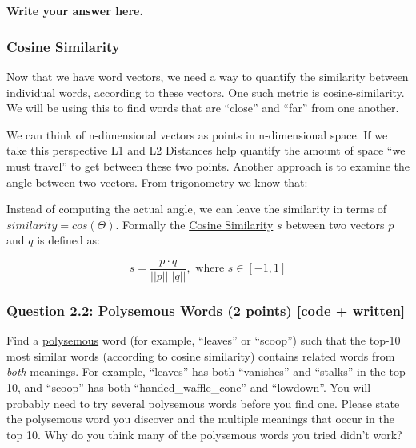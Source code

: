\documentclass[18pt]{article}
\begin{document}
    \begin{center}
    \end{center}
    { \hspace*{\fill} \\}
    
    \hypertarget{write-your-answer-here.}{%
\paragraph{Write your answer here.}\label{write-your-answer-here.}}

    \hypertarget{cosine-similarity}{%
\subsubsection{Cosine Similarity}\label{cosine-similarity}}

Now that we have word vectors, we need a way to quantify the similarity
between individual words, according to these vectors. One such metric is
cosine-similarity. We will be using this to find words that are
``close'' and ``far'' from one another.

We can think of n-dimensional vectors as points in n-dimensional space.
If we take this perspective L1 and L2 Distances help quantify the amount
of space ``we must travel'' to get between these two points. Another
approach is to examine the angle between two vectors. From trigonometry
we know that:

Instead of computing the actual angle, we can leave the similarity in
terms of \(similarity = cos(\Theta)\). Formally the
\href{https://en.wikipedia.org/wiki/Cosine_similarity}{Cosine
Similarity} \(s\) between two vectors \(p\) and \(q\) is defined as:

\[s = \frac{p \cdot q}{||p|| ||q||}, \textrm{ where } s \in [-1, 1] \]

    \hypertarget{question-2.2-polysemous-words-2-points-code-written}{%
\subsubsection{Question 2.2: Polysemous Words (2 points) {[}code +
written{]}}\label{question-2.2-polysemous-words-2-points-code-written}}

Find a \href{https://en.wikipedia.org/wiki/Polysemy}{polysemous} word
(for example, ``leaves'' or ``scoop'') such that the top-10 most similar
words (according to cosine similarity) contains related words from
\emph{both} meanings. For example, ``leaves'' has both ``vanishes'' and
``stalks'' in the top 10, and ``scoop'' has both
``handed\_waffle\_cone'' and ``lowdown''. You will probably need to try
several polysemous words before you find one. Please state the
polysemous word you discover and the multiple meanings that occur in the
top 10. Why do you think many of the polysemous words you tried didn't
work?
\end{document}
